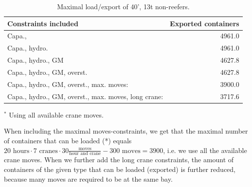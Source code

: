 \begin{table}[width=.9\linewidth,cols=2,pos=htbp]
\caption{Maximal load/export of 40', 13t non-reefers.}\label{tab:resultsPS}
\begin{threeparttable}
\begin{tabular*}{\tblwidth}{@{} LR @{}}
\toprule
Constraints included						  		&Exported containers\\
\midrule
Capa., 												&4961.0\phantom{\tn{$^{*}$}}\\
Capa., hydro. 										&4961.0\phantom{\tn{$^{*}$}}\\
Capa., hydro., GM									&4627.8\phantom{\tn{$^{*}$}}\\
Capa., hydro., GM, overst.							&4627.8\phantom{\tn{$^{*}$}}\\
Capa., hydro., GM, overst., max. moves:				&3900.0\tn{$^{*}$}\\ 
Capa., hydro., GM, overst., max. moves, long crane:	&3717.6\phantom{\tn{$^{*}$}}\\
\bottomrule
\end{tabular*}
\begin{tablenotes}
\item[$^*$]Using all available crane moves.
\end{tablenotes}
\end{threeparttable}
\end{table}

When including the maximal moves-constraints, we get that the maximal number of containers that can be loaded (*) equals $20\text{ hours}\cdot7\text{ cranes}\cdot 30 \frac{\text{moves}}{\text{hour and crane}} - 300 \text{ moves} = 3900$, i.e. we use all the available crane moves.  
When we further add the long crane constraints, the amount of containers of the given type that can be loaded (exported) is further reduced, because many moves are required to be at the same bay.

